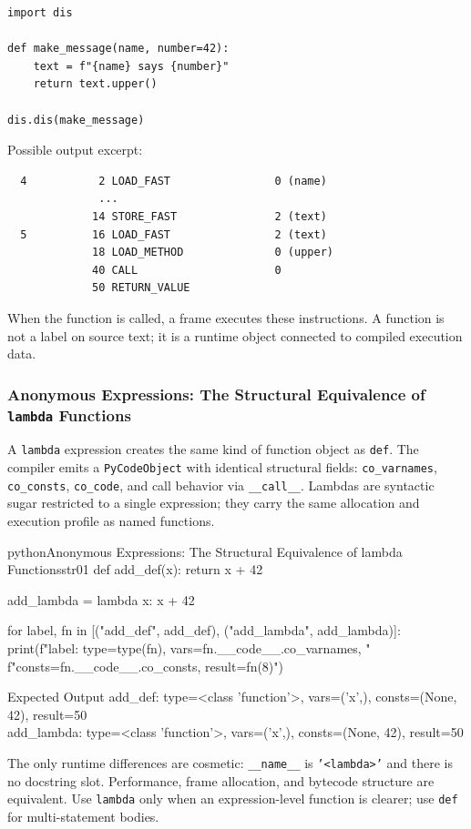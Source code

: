 \begin{verbatim}
import dis

def make_message(name, number=42):
    text = f"{name} says {number}"
    return text.upper()

dis.dis(make_message)
\end{verbatim}

Possible output excerpt:

\begin{verbatim}
  4           2 LOAD_FAST                0 (name)
              ...
             14 STORE_FAST               2 (text)
  5          16 LOAD_FAST                2 (text)
             18 LOAD_METHOD              0 (upper)
             40 CALL                     0
             50 RETURN_VALUE
\end{verbatim}

When the function is called, a frame executes these instructions. A function is not a label on source text; it is a runtime object connected to compiled execution data.

\subsubsection{Anonymous Expressions: The Structural Equivalence of \texttt{lambda} Functions}

A \texttt{lambda} expression creates the same kind of function object as \texttt{def}. The compiler emits a \texttt{PyCodeObject} with identical structural fields: \texttt{co\_varnames}, \texttt{co\_consts}, \texttt{co\_code}, and call behavior via \texttt{\_\_call\_\_}. Lambdas are syntactic sugar restricted to a single expression; they carry the same allocation and execution profile as named functions.

\begin{codebox}[]{python}{Anonymous Expressions: The Structural Equivalence of lambda Functions}{str01}
def add_def(x):
    return x + 42

add_lambda = lambda x: x + 42

for label, fn in [("add_def", add_def), ("add_lambda", add_lambda)]:
    print(f"{label}: type={type(fn)}, vars={fn.__code__.co_varnames}, "
          f"consts={fn.__code__.co_consts}, result={fn(8)}")
\end{codebox}


\begin{iobox}{Expected Output}
add\_def: type=<class 'function'>, vars=('x',), consts=(None, 42), result=50 \\
add\_lambda: type=<class 'function'>, vars=('x',), consts=(None, 42), result=50 \\
\end{iobox}




The only runtime differences are cosmetic: \texttt{\_\_name\_\_} is \texttt{'<lambda>'} and there is no docstring slot. Performance, frame allocation, and bytecode structure are equivalent. Use \texttt{lambda} only when an expression-level function is clearer; use \texttt{def} for multi-statement bodies.
